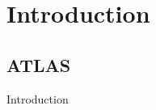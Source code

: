 \section{Introduction}

\subsection{ATLAS}

\begin{frame}
	\begin{center}
	\Large{Introduction}
	\end{center}
\end{frame}


